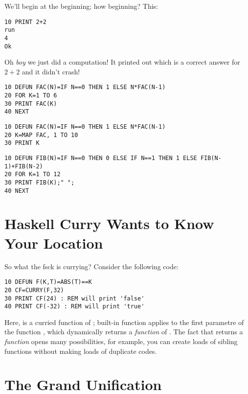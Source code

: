 \quad
{}

We'll begin at the beginning; how beginning? This:

\begin{lstlisting}
10 PRINT 2+2
run
4
Ok
\end{lstlisting}

Oh \emph{boy} we just did a computation! It printed out  which is a correct answer for $2+2$ and it didn't crash!

\begin{lstlisting}
10 DEFUN FAC(N)=IF N==0 THEN 1 ELSE N*FAC(N-1)
20 FOR K=1 TO 6
30 PRINT FAC(K)
40 NEXT
\end{lstlisting}

\begin{lstlisting}
10 DEFUN FAC(N)=IF N==0 THEN 1 ELSE N*FAC(N-1)
20 K=MAP FAC, 1 TO 10
30 PRINT K
\end{lstlisting}


\begin{lstlisting}
10 DEFUN FIB(N)=IF N==0 THEN 0 ELSE IF N==1 THEN 1 ELSE FIB(N-1)+FIB(N-2)
20 FOR K=1 TO 12
30 PRINT FIB(K);" ";
40 NEXT
\end{lstlisting}

\section[Currying]{Haskell Curry Wants to Know Your Location}

So what the fsck is currying? Consider the following code:

\begin{lstlisting}
10 DEFUN F(K,T)=ABS(T)==K
20 CF=CURRY(F,32)
30 PRINT CF(24) : REM will print 'false'
40 PRINT CF(-32) : REM will print 'true'
\end{lstlisting}

Here,  is a curried function of ; built-in function  applies  to the first parametre of the function , which dynamically returns a \emph{function} of . The fact that  returns a \emph{function} opens many possibilities, for example, you can create loads of sibling functions without making loads of duplicate codes.

\section[Wrapping-Up]{The Grand Unification}

